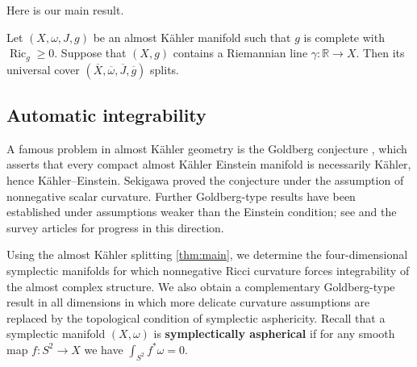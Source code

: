 \documentclass[11pt,twoside]{amsart}
\DeclareMathOperator{\Ric}{Ric}
\newcommand{\R}{\mathbb{R}}
\begin{document}
Here is our main result.
\begin{theorem}\label{thm:main}
     Let $(X,\omega,J,g)$ be an almost K\"ahler manifold such that  $g$ is complete with $\Ric_g\geq 0$. Suppose that
    $(X,g)$ contains a Riemannian line $\gamma\colon \R \to X$.
    Then its universal cover $(\overline X, \overline \omega, \overline J, \overline g)$ splits.
\end{theorem}

\subsection{Automatic integrability}
A famous problem in almost K\"ahler geometry is the Goldberg conjecture \cite{Goldberg1969}, which asserts that every compact almost K\"ahler Einstein manifold is necessarily K\"ahler, hence K\"ahler--Einstein. Sekigawa \cite{Sekigawa} proved the conjecture under the assumption of nonnegative scalar curvature. Further Goldberg-type results have been established under assumptions weaker than the Einstein condition; see \cite{Draghici1994,Draghici1995,Draghici1999,ApostolovDraghici2000,ApostolovDraghiciKotschick1999,Kirchberg} and the survey articles \cite{apostolov_draghici_survey,OguroSekigawa2005} for progress in this direction.


Using the almost K\"ahler splitting \autoref{thm:main}, we determine the four-dimensional symplectic manifolds for which nonnegative Ricci curvature forces integrability of the almost complex structure. We also obtain a complementary Goldberg-type result in all dimensions in which more delicate curvature assumptions are replaced by the topological condition of symplectic asphericity. 
Recall that a symplectic manifold $(X,\omega)$ is \textbf{symplectically aspherical} if for any smooth map $f\colon S^2 \to X$ we have $\int_{S^2}f^*\omega = 0$. 
\end{document}
